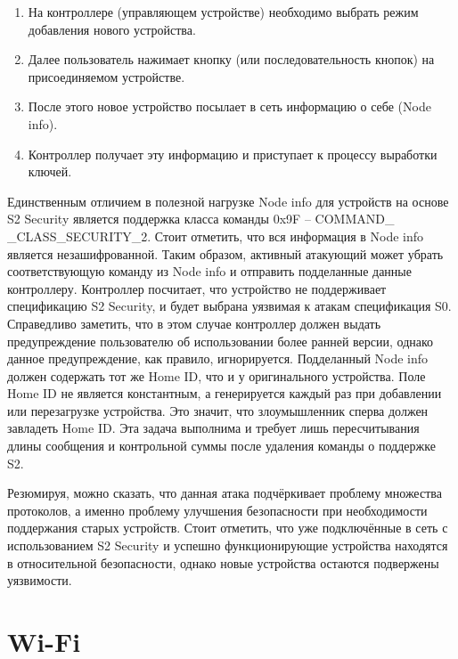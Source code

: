 	\begin{enumerate}
		\item На контроллере (управляющем устройстве) необходимо выбрать режим добавления нового
		устройства.
		\item Далее пользователь нажимает кнопку (или последовательность кнопок) на присоединяемом
		устройстве.
		\item После этого новое устройство посылает в сеть информацию о себе (Node info).
		\item Контроллер получает эту информацию и приступает к процессу выработки ключей.
	\end{enumerate}

	Единственным отличием в полезной нагрузке Node info для устройств на основе S2 Security является
	поддержка класса команды 0x9F – COMMAND\_ \newline \_CLASS\_SECURITY\_2. Стоит отметить, что
	вся информация в Node info является незашифрованной. Таким образом, активный атакующий может
	убрать соответствующую команду из Node info и отправить подделанные данные контроллеру. Контроллер
	посчитает, что устройство не поддерживает спецификацию S2 Security, и будет выбрана уязвимая к атакам
	спецификация S0. Справедливо заметить, что в этом случае контроллер должен выдать предупреждение
	пользователю об использовании более ранней версии, однако данное предупреждение, как правило,
	игнорируется. Подделанный Node info должен содержать тот же Home ID, что и у оригинального
	устройства. Поле Home ID не является константным, а генерируется каждый раз при добавлении или
	перезагрузке устройства. Это значит, что злоумышленник сперва должен завладеть Home ID. Эта
	задача выполнима и требует лишь пересчитывания длины сообщения и контрольной суммы после удаления 
	команды о поддержке S2.
	
	Резюмируя, можно сказать, что данная атака подчёркивает проблему множества протоколов, а именно
	проблему улучшения безопасности при необходимости поддержания старых устройств. Стоит отметить,
	что уже подключённые в сеть с использованием S2 Security и успешно функционирующие устройства 
	находятся в относительной безопасности, однако новые устройства остаются подвержены уязвимости.
	
	
	\section{Wi-Fi}
	
	
